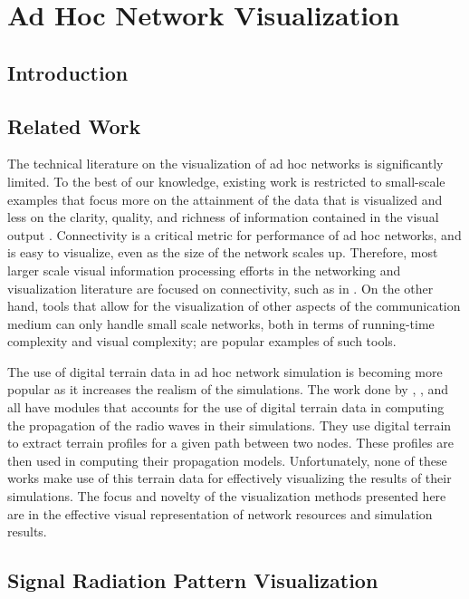 \chapter{Ad Hoc Network Visualization}
\label{chap:network_vis}

\section{Introduction}


\section{Related Work}
The technical literature on the visualization of ad hoc networks is significantly limited. To the best of our knowledge, existing work is restricted to small-scale examples that focus more on the attainment of the data that is visualized and less on the clarity, quality, and richness of information contained in the visual output \cite{DhoVoGue03}. Connectivity is a critical metric for performance of ad hoc networks, and is easy to visualize, even as the size of the network scales up. Therefore, most larger scale visual information processing efforts in the networking and visualization literature are focused on connectivity, such as in \cite{Bettsetetter04, HamWij04, BecEicWil95, HerMelMar00}. On the other hand, tools that allow for the visualization of other aspects of the communication medium can only handle small scale networks, both in terms of running-time complexity and visual complexity; \cite{FitSeeRei04, MatBieLau05, EstHanHei00} are popular examples of such tools.

The use of digital terrain data in ad hoc network simulation is becoming more popular as it increases the realism of the simulations.  The work done by \cite{LuiPerNic01}, \cite{BonWanSta98}, and \cite{DzaTraFil07} all have modules that accounts for the use of digital terrain data in computing the propagation of the radio waves in their simulations.  They use digital terrain to extract terrain profiles for a given path between two nodes.  These profiles are then used in computing their propagation models.  Unfortunately, none of these works make use of this terrain data for effectively visualizing the results of their simulations.  The focus and novelty of the visualization methods presented here are in the effective visual representation of network resources and simulation results.


\section{Signal Radiation Pattern Visualization}
